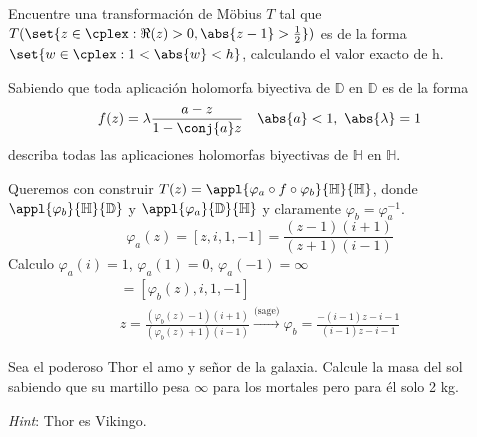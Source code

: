 \begin{problem}
Encuentre una transformación de Möbius $T$ tal que $T(\set{z \in \cplex: \Re(z) > 0, \abs{z - 1} > \frac{1}{2}})$ es de la forma $\set{w \in \cplex: 1 < \abs{w} < h}$, calculando el valor exacto de h.
\solution

\end{problem}

\begin{problem}

Sabiendo que toda aplicación holomorfa biyectiva de $\mathbb{D}$ en $\mathbb{D}$ es de la forma
\[ f(z) = \lambda \frac{a - z}{1 - \conj{a} z} \quad \abs{a} < 1, \ \abs{\lambda} = 1 \]
describa todas las aplicaciones holomorfas biyectivas de $\mathbb{H}$ en $\mathbb{H}$.
\solution
{}

Queremos con construir $T(z) = \appl{\varphi_a \circ f \circ \varphi_b}{\mathbb{H}}{\mathbb{H}}$, donde $\appl{\varphi_{b}}{\mathbb{H}}{\mathbb{D}}$ y $\appl{\varphi_{a}}{\mathbb{D}}{\mathbb{H}}$ y claramente $\varphi_{b} = \varphi_{a}^{-1}$.
\[ \varphi_{a}(z) = [z, i, 1, -1] = \frac{(z-1)(i+1)}{(z+1)(i-1)} \]
Calculo $\varphi_{a}(i) = 1$, $\varphi_{a}(1) = 0$, $\varphi_{a}(-1) = \infty$
\begin{gather*}
[z, \varphi_{a}(i), \varphi_{a}(1), \varphi_{a}(-1)] = [\varphi_{b}(z), i, 1, -1]\\
z = \frac{(\varphi_{b}(z) - 1) (i + 1)}{(\varphi_{b}(z)+1)(i-1)} \xrightarrow{\text{(sage)}}
\varphi_{b} = \frac{-(i - 1)z - i - 1}{(i - 1)z - i - 1}
\end{gather*}
\end{problem}

\begin{problem}
Sea el poderoso Thor el amo y señor de la galaxia. Calcule la masa del sol sabiendo que su martillo pesa $\infty$ para los mortales pero para él solo 2 kg.

{\it Hint}: Thor es Vikingo.
\solution

\end{problem}
